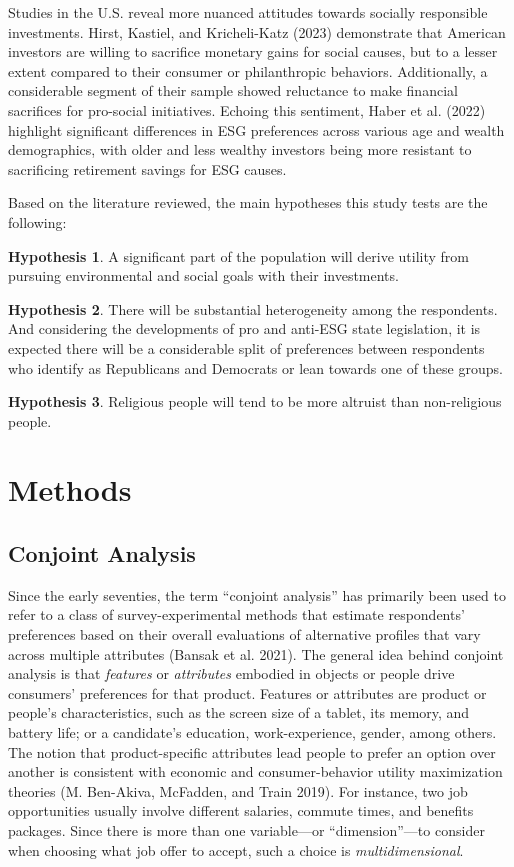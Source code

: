 \documentclass[
  12pt,
]{article}
\begin{document}
Studies in the U.S. reveal more nuanced attitudes towards socially responsible investments. Hirst, Kastiel, and Kricheli-Katz (2023) demonstrate that American investors are willing to sacrifice monetary gains for social causes, but to a lesser extent compared to their consumer or philanthropic behaviors. Additionally, a considerable segment of their sample showed reluctance to make financial sacrifices for pro-social initiatives. Echoing this sentiment, Haber et al. (2022) highlight significant differences in ESG preferences across various age and wealth demographics, with older and less wealthy investors being more resistant to sacrificing retirement savings for ESG causes.

Based on the literature reviewed, the main hypotheses this study tests are the following:

\textbf{Hypothesis 1}. A significant part of the population will derive utility from pursuing environmental and social goals with their investments.

\textbf{Hypothesis 2}. There will be substantial heterogeneity among the respondents. And considering the developments of pro and anti-ESG state legislation, it is expected there will be a considerable split of preferences between respondents who identify as Republicans and Democrats or lean towards one of these groups.

\textbf{Hypothesis 3}. Religious people will tend to be more altruist than non-religious people.

\hypertarget{methods}{%
\section{Methods}\label{methods}}

\hypertarget{conjoint-analysis}{%
\subsection{Conjoint Analysis}\label{conjoint-analysis}}

Since the early seventies, the term ``conjoint analysis'' has primarily been used to refer to a class of survey-experimental methods that estimate respondents' preferences based on their overall evaluations of alternative profiles that vary across multiple attributes (Bansak et al. 2021). The general idea behind conjoint analysis is that \emph{features} or \emph{attributes} embodied in objects or people drive consumers' preferences for that product. Features or attributes are product or people's characteristics, such as the screen size of a tablet, its memory, and battery life; or a candidate's education, work-experience, gender, among others. The notion that product-specific attributes lead people to prefer an option over another is consistent with economic and consumer-behavior utility maximization theories (M. Ben-Akiva, McFadden, and Train 2019). For instance, two job opportunities usually involve different salaries, commute times, and benefits packages. Since there is more than one variable---or ``dimension''---to consider when choosing what job offer to accept, such a choice is \emph{multidimensional}.
\end{document}
